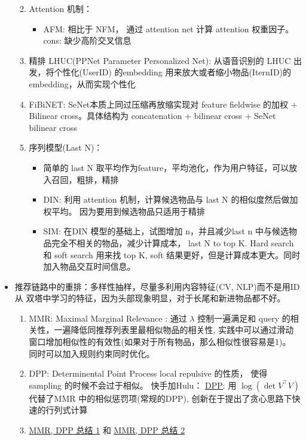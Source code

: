 \documentclass[12pt]{article}
\numberwithin{theorem}{section} %
\numberwithin{definition}{section} %
\numberwithin{assumption}{section} %
\numberwithin{lemma}{section} %
\numberwithin{remark}{section} %
\numberwithin{prop}{section} %
\numberwithin{corollary}{section} %
\numberwithin{example}{section} %
\numberwithin{question}{section} %
\numberwithin{problem}{section} %
\numberwithin{conjecture}{section} %
\numberwithin{append}{section} %
\numberwithin{property}{section} %
\begin{document}
\begin{CJK}{UTF8}{gbsn}
\begin{itemize}
\begin{enumerate}
\begin{itemize}
		\end{itemize}
	\item Attention 机制：
	\begin{itemize}
		\item AFM: 相比于 NFM， 通过 attention net 计算 attention 权重因子。cons: 缺少高阶交叉信息
	\end{itemize}
	\item 精排 LHUC(PPNet Parameter Personalized Net): 从语音识别的 LHUC 出发，将个性化(UserID) 的embedding 用来放大或者缩小物品(IternID)的 embedding，从而实现个性化
	\item FiBiNET: SeNet本质上同过压缩再放缩实现对 feature fieldwise 的加权 $+$ Bilinear cross。具体结构为 concatenation + bilinear cross + SeNet bilinear cross
	\item 序列模型(Last N)：
	\begin{itemize}
		\item 简单的 last N 取平均作为feature，平均池化，作为用户特征，可以放入召回，粗排，精排
		\item DIN: 利用 attention 机制，计算候选物品与 last N 的相似度然后做加权平均。 因为要用到候选物品只适用于精排
		\item SIM: 在DIN 模型的基础上，试图增加 n，并且减少last n 中与候选物品完全不相关的物品，减少计算成本， last N to top K. Hard search 和 soft search 用来找 top K, soft 结果更好，但是计算成本更大。同时加入物品交互时间信息。
	\end{itemize}
	\end{enumerate}

	\item 推荐链路中的重排：多样性抽样，尽量多利用内容特征(CV, NLP)而不是用ID 从 双塔中学习的特征，因为头部现象明显，对于长尾和新进物品都不好。
	\begin{enumerate}
		\item MMR: Maximal Marginal Relevance : 通过 $\lambda$ 控制一遍满足和 query 的相关性，一遍降低同推荐列表里最相似物品的相关性, 实践中可以通过滑动窗口增加相似性的有效性(如果对于所有物品，那么相似性很容易是1)。 同时可以加入规则约束同时优化。
		\item DPP: Determinental Point Process local repulsive 的性质， 使得 sampling 的时候不会过于相似。 快手加Hulu： \href{https://proceedings.neurips.cc/paper/2018/file/dbbf603ff0e99629dda5d75b6f75f966-Paper.pdf}{DPP}: 用 $\log(\det V^\intercal V)$ 代替了MMR 中的相似惩罚项(常规的DPP), 创新在于提出了贪心思路下快速的行列式计算
		\item \href{https://www.zhihu.com/question/62962281}{MMR, DPP 总结 1} 和 \href{https://zhuanlan.zhihu.com/p/411553235}{MMR, DPP 总结 2}
	\end{enumerate}
	

\end{itemize}
\end{CJK}
\end{document}
